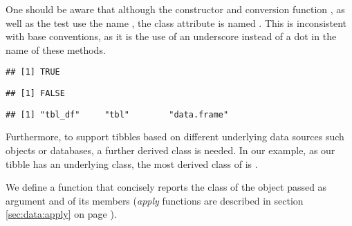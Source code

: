 \documentclass[krantz2]{krantz}\usepackage{knitr}
\begin{document}
\begin{infobox}
One should be aware that although the constructor  and conversion function , as well as the test  use the name , the class attribute is named . This is inconsistent with base \Rlang conventions, as it is the use of an underscore instead of a dot in the name of these methods.

\begin{knitrout}\footnotesize
{}\color{fgcolor}\begin{kframe}
\begin{alltt}
 \hlkwb{<-} \hlstd{(} \hlstd{=} \hlopt{:}\hlstd{)}
\end{alltt}
\begin{verbatim}
## [1] TRUE
\end{verbatim}
\begin{alltt}
 \hlstd{)}
\end{alltt}
\begin{verbatim}
## [1] FALSE
\end{verbatim}
\begin{alltt}
\end{alltt}
\begin{verbatim}
## [1] "tbl_df"     "tbl"        "data.frame"
\end{verbatim}
\end{kframe}
\end{knitrout}

Furthermore, to support tibbles based on different underlying data sources such  objects or databases, a further derived class is needed. In our example, as our tibble has an underlying  class, the most derived class of  is .
\end{infobox}

We define a function that concisely reports the class of the object passed as argument and of its members (\emph{apply} functions are described in section \ref{sec:data:apply} on page \pageref{sec:data:apply}).

\begin{knitrout}\footnotesize
{}\color{fgcolor}\begin{kframe}
\begin{alltt}
 \hlkwb{<-} \hlstd{(}\hlstd{) \{}
  \hlstd{(}
    \hlstd{(}\hlstd{(}\hlstd{(x)[}\hlstd{],}
    \hlstd{),}
    \hlstd{(}
            \hlstd{=} \hlstd{,}  \hlstd{=} \hlstd{),}
     \hlstd{=} \hlstd{)}
    \hlstd{)}
\hlstd{\}}
\end{alltt}
\end{kframe}
\end{knitrout}
\end{document}
